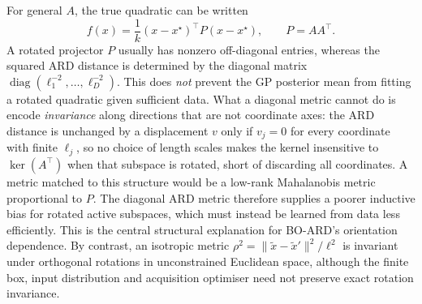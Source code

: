 \documentclass[11pt,a4paper]{article}
\begin{document}
For general $A$, the true quadratic can be written
\begin{equation}f(x)=\frac1k(x-x^\star)^\top P(x-x^\star),\qquad P=AA^\top.\end{equation}
A rotated projector $P$ usually has nonzero off-diagonal entries, whereas the squared ARD distance is determined by the diagonal matrix $\operatorname{diag}(\ell_1^{-2},\ldots,\ell_D^{-2})$. This does \emph{not} prevent the GP posterior mean from fitting a rotated quadratic given sufficient data. What a diagonal metric cannot do is encode \emph{invariance} along directions that are not coordinate axes: the ARD distance is unchanged by a displacement $v$ only if $v_j=0$ for every coordinate with finite $\ell_j$, so no choice of length scales makes the kernel insensitive to $\ker(A^\top)$ when that subspace is rotated, short of discarding all coordinates. A metric matched to this structure would be a low-rank Mahalanobis metric proportional to $P$. The diagonal ARD metric therefore supplies a poorer inductive bias for rotated active subspaces, which must instead be learned from data less efficiently. This is the central structural explanation for BO-ARD's orientation dependence. By contrast, an isotropic metric $\rho^2=\|\tilde x-\tilde x'\|^2/\ell^2$ is invariant under orthogonal rotations in unconstrained Euclidean space, although the finite box, input distribution and acquisition optimiser need not preserve exact rotation invariance.
\end{document}
